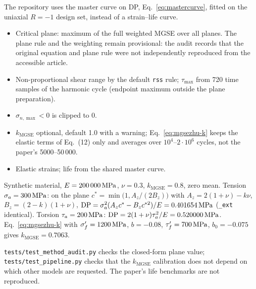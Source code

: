  The repository uses the master curve on DP, Eq.~\eqref{eq:mastercurve}, fitted on the
uniaxial $R=-1$ design set, instead of a strain--life curve.

\begin{itemize}
\item Critical plane: maximum of the full weighted MGSE over all planes. The plane rule and the
  weighting remain provisional: the audit records that the original equation and plane rule were
  not independently reproduced from the accessible article.
\item Non-proportional shear range by the default \texttt{rss} rule; $\tau_{\max}$ from 720 time
  samples of the harmonic cycle (endpoint maximum outside the plane preparation).
\item $\sigma_{n,\max}<0$ is clipped to $0$.
\item $k_\mathrm{MGSE}$ optional, default 1.0 with a warning; Eq.~\eqref{eq:mgsezhu-k} keeps the
  elastic terms of Eq.~(12) only and averages over $10^4$--$2\cdot10^6$ cycles, not the paper's
  5000--50\,000.
\item Elastic strains; life from the shared master curve.
\end{itemize}

 Synthetic material, $E=200\,000\,\mathrm{MPa}$, $\nu=0.3$, $k_\mathrm{MGSE}=0.8$,
zero mean. Tension $\sigma_a=300\,\mathrm{MPa}$: on the plane $c^*=\min\bigl(1,A_z/(2B_z)\bigr)$ with
$A_z=2(1+\nu)-k\nu$, $B_z=(2-k)(1+\nu)$, $\mathrm{DP}=\sigma_a^2(A_zc^*-B_zc^{*2})/E=0.401654\,\mathrm{MPa}$
(\texttt{\_ext} identical). Torsion $\tau_a=200\,\mathrm{MPa}$: $\mathrm{DP}=2(1+\nu)\tau_a^2/E=0.520000\,\mathrm{MPa}$.
Eq.~\eqref{eq:mgsezhu-k} with $\sigma_f'=1200\,\mathrm{MPa}$, $b=-0.08$, $\tau_f'=700\,\mathrm{MPa}$, $b_0=-0.075$ gives
$k_\mathrm{MGSE}=0.7063$.

 \texttt{tests/test\_method\_audit.py} checks the closed-form plane value;
\texttt{tests/test\_pipeline.py} checks that the $k_\mathrm{MGSE}$ calibration does not depend on
which other models are requested. The paper's life benchmarks are not reproduced.
